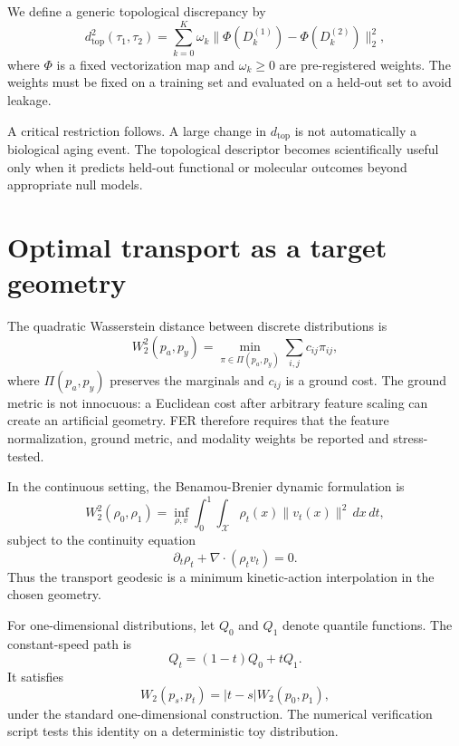 \documentclass[11pt]{article}
\begin{document}
We define a generic topological discrepancy by
\begin{equation}
 d_{\mathrm{top}}^2(\tau_1,\tau_2)=\sum_{k=0}^{K}\omega_k \|\Phi(D_k^{(1)})-\Phi(D_k^{(2)})\|_2^2,
\label{eq:topdist}
\end{equation}
where $\Phi$ is a fixed vectorization map and $\omega_k\geq 0$ are pre-registered weights. The weights must be fixed on a training set and evaluated on a held-out set to avoid leakage.

A critical restriction follows. A large change in $d_{\mathrm{top}}$ is not automatically a biological aging event. The topological descriptor becomes scientifically useful only when it predicts held-out functional or molecular outcomes beyond appropriate null models.

\section{Optimal transport as a target geometry}
The quadratic Wasserstein distance between discrete distributions is
\begin{equation}
 W_2^2(p_a,p_y)=\min_{\pi\in\Pi(p_a,p_y)}\sum_{i,j} c_{ij}\pi_{ij},
\label{eq:w2}
\end{equation}
where $\Pi(p_a,p_y)$ preserves the marginals and $c_{ij}$ is a ground cost. The ground metric is not innocuous: a Euclidean cost after arbitrary feature scaling can create an artificial geometry. FER therefore requires that the feature normalization, ground metric, and modality weights be reported and stress-tested.

In the continuous setting, the Benamou-Brenier dynamic formulation is
\begin{equation}
 W_2^2(\rho_0,\rho_1)=\inf_{\rho,v}\int_0^1\int_{\mathcal X}\rho_t(x)\|v_t(x)\|^2\,dx\,dt,
\label{eq:bb}
\end{equation}
subject to the continuity equation
\begin{equation}
 \partial_t\rho_t+\nabla\cdot(\rho_t v_t)=0.
\label{eq:continuity}
\end{equation}
Thus the transport geodesic is a minimum kinetic-action interpolation in the chosen geometry.

For one-dimensional distributions, let $Q_0$ and $Q_1$ denote quantile functions. The constant-speed path is
\begin{equation}
 Q_t=(1-t)Q_0+tQ_1.
\label{eq:quantile}
\end{equation}
It satisfies
\begin{equation}
 W_2(p_s,p_t)=|t-s|W_2(p_0,p_1),
\label{eq:constant}
\end{equation}
under the standard one-dimensional construction. The numerical verification script tests this identity on a deterministic toy distribution.
\end{document}
